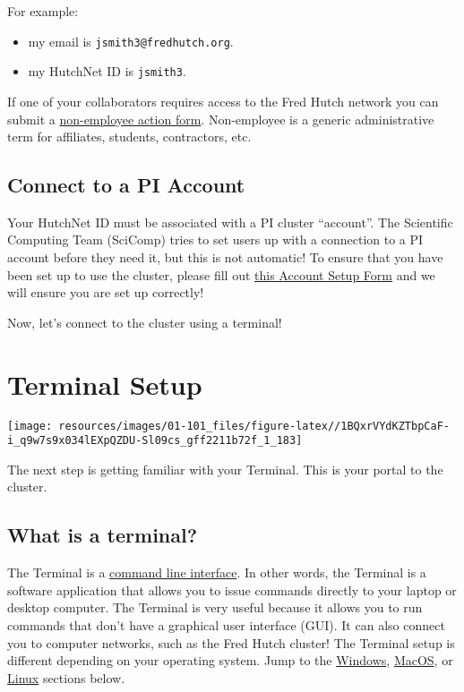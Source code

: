 \documentclass[
]{book}
\providecommand{\tightlist}{%
  \setlength{\itemsep}{0pt}\setlength{\parskip}{0pt}}
\begin{document}
For example:

\begin{itemize}
\tightlist
\item
  my email is \texttt{jsmith3@fredhutch.org}.\\
\item
  my HutchNet ID is \texttt{jsmith3}.
\end{itemize}

If one of your collaborators requires access to the Fred Hutch network you can submit a \href{https://centernet.fredhutch.org/cn/f/hr/lcex/non-employee-action-form.html}{non-employee action form}. Non-employee is a generic administrative term for affiliates, students, contractors, etc.

\hypertarget{pi-account}{%
\section{Connect to a PI Account}\label{pi-account}}

Your HutchNet ID must be associated with a PI cluster ``account''. The Scientific Computing Team (SciComp) tries to set users up with a connection to a PI account before they need it, but this is not automatic! To ensure that you have been set up to use the cluster, please fill out \href{https://forms.gle/5ct8mQCeBD7LUt6S7}{this Account Setup Form} and we will ensure you are set up correctly!

Now, let's connect to the cluster using a terminal!

\hypertarget{terminal}{%
\chapter{Terminal Setup}\label{terminal}}

\texttt{[image: resources/images/01-101\_files/figure-latex//1BQxrVYdKZTbpCaF-i\_q9w7s9x034lEXpQZDU-Sl09cs\_gff2211b72f\_1\_183]}

The next step is getting familiar with your Terminal. This is your portal to the cluster.

\hypertarget{what-is-a-terminal}{%
\section{What is a terminal?}\label{what-is-a-terminal}}

The Terminal is a \href{https://www.codecademy.com/article/command-line-interface}{command line interface}. In other words, the Terminal is a software application that allows you to issue commands directly to your laptop or desktop computer. The Terminal is very useful because it allows you to run commands that don't have a graphical user interface (GUI). It can also connect you to computer networks, such as the Fred Hutch cluster! The Terminal setup is different depending on your operating system. Jump to the \protect\hyperlink{windows}{Windows}, \protect\hyperlink{mac}{MacOS}, or \protect\hyperlink{linux}{Linux} sections below.
\end{document}

